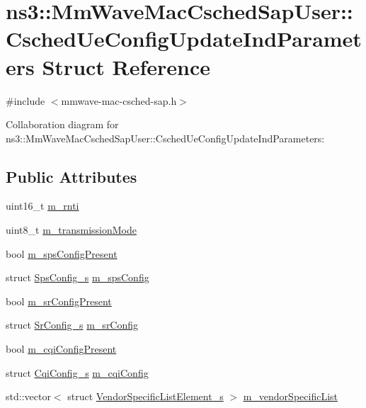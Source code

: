 \hypertarget{structns3_1_1MmWaveMacCschedSapUser_1_1CschedUeConfigUpdateIndParameters}{}\section{ns3\+:\+:Mm\+Wave\+Mac\+Csched\+Sap\+User\+:\+:Csched\+Ue\+Config\+Update\+Ind\+Parameters Struct Reference}
\label{structns3_1_1MmWaveMacCschedSapUser_1_1CschedUeConfigUpdateIndParameters}


{\ttfamily \#include $<$mmwave-\/mac-\/csched-\/sap.\+h$>$}



Collaboration diagram for ns3\+:\+:Mm\+Wave\+Mac\+Csched\+Sap\+User\+:\+:Csched\+Ue\+Config\+Update\+Ind\+Parameters\+:
\subsection*{Public Attributes}
\begin{DoxyCompactItemize}
\item 
uint16\+\_\+t \hyperlink{structns3_1_1MmWaveMacCschedSapUser_1_1CschedUeConfigUpdateIndParameters_ac81bb9b14de5091c6e72fae1103bd7ae}{m\+\_\+rnti}
\item 
uint8\+\_\+t \hyperlink{structns3_1_1MmWaveMacCschedSapUser_1_1CschedUeConfigUpdateIndParameters_a60055db8b4b601d5f64de6465c5a9e54}{m\+\_\+transmission\+Mode}
\item 
bool \hyperlink{structns3_1_1MmWaveMacCschedSapUser_1_1CschedUeConfigUpdateIndParameters_a1abdfb2fbcdc278109a90304377564f2}{m\+\_\+sps\+Config\+Present}
\item 
struct \hyperlink{structns3_1_1SpsConfig__s}{Sps\+Config\+\_\+s} \hyperlink{structns3_1_1MmWaveMacCschedSapUser_1_1CschedUeConfigUpdateIndParameters_a13fffcc947b2490168e2e9570be10e3c}{m\+\_\+sps\+Config}
\item 
bool \hyperlink{structns3_1_1MmWaveMacCschedSapUser_1_1CschedUeConfigUpdateIndParameters_a7537ad59a30311264b38e633c38461f0}{m\+\_\+sr\+Config\+Present}
\item 
struct \hyperlink{structns3_1_1SrConfig__s}{Sr\+Config\+\_\+s} \hyperlink{structns3_1_1MmWaveMacCschedSapUser_1_1CschedUeConfigUpdateIndParameters_a140c4fe5347637a3aae456ec70c8065d}{m\+\_\+sr\+Config}
\item 
bool \hyperlink{structns3_1_1MmWaveMacCschedSapUser_1_1CschedUeConfigUpdateIndParameters_a3322a6c7a9a14086c328913c92cbfbf0}{m\+\_\+cqi\+Config\+Present}
\item 
struct \hyperlink{structns3_1_1CqiConfig__s}{Cqi\+Config\+\_\+s} \hyperlink{structns3_1_1MmWaveMacCschedSapUser_1_1CschedUeConfigUpdateIndParameters_ac97790611d7c409038fc07bf7feaf6bf}{m\+\_\+cqi\+Config}
\item 
std\+::vector$<$ struct \hyperlink{structns3_1_1VendorSpecificListElement__s}{Vendor\+Specific\+List\+Element\+\_\+s} $>$ \hyperlink{structns3_1_1MmWaveMacCschedSapUser_1_1CschedUeConfigUpdateIndParameters_ad500c1dbf787b712f4020a28d971e5ee}{m\+\_\+vendor\+Specific\+List}
\end{DoxyCompactItemize}


